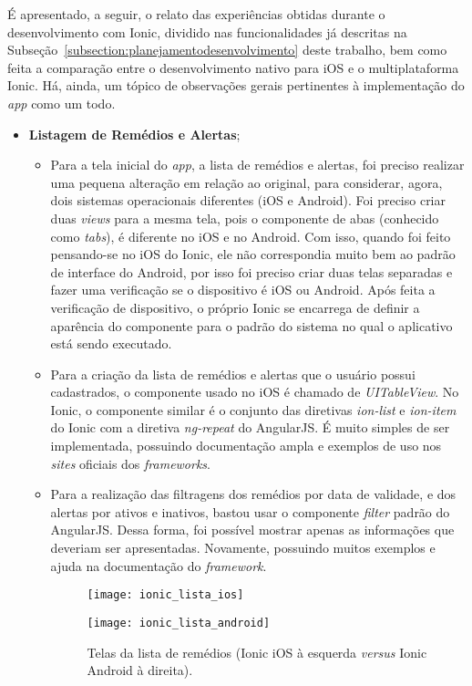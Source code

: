 É apresentado, a seguir, o relato das experiências obtidas durante o desenvolvimento com Ionic, dividido nas funcionalidades 
já descritas na Subseção~\ref{subsection:planejamentodesenvolvimento} deste trabalho, bem como feita a comparação entre o desenvolvimento nativo para iOS e 
o multiplataforma Ionic. Há, ainda, um tópico de observações gerais pertinentes à implementação do \textit{app} como um todo. 


 \begin{itemize}
 	
 	\item \textbf{Listagem de Remédios e Alertas};
		\begin{itemize}
			\item Para a tela inicial do \textit{app}, a lista de remédios e alertas, foi preciso realizar uma pequena alteração em relação ao original, para considerar, agora, 
			dois sistemas operacionais diferentes (iOS e Android). Foi preciso criar duas 
			\textit{views} para a mesma tela, pois o componente de abas (conhecido como \textit{tabs}), é diferente no iOS e no Android. Com isso, quando foi feito pensando-se no iOS do Ionic, ele não correspondia 
			muito bem ao padrão de interface do Android, por isso foi preciso criar duas telas separadas e fazer uma verificação se o dispositivo é iOS ou Android. Após feita a verificação de dispositivo, o próprio
			Ionic se encarrega de definir a aparência do componente para o padrão do sistema no qual o aplicativo está sendo executado.

			\item Para a criação da lista de remédios e alertas que o usuário possui cadastrados, o componente usado no iOS é chamado de \textit{UITableView}. No Ionic, o componente similar é o conjunto das diretivas 
			\textit{ion-list} e \textit{ion-item} do Ionic com a diretiva \textit{ng-repeat} do AngularJS. 
			É muito simples de ser implementada, possuindo documentação ampla e exemplos de uso nos \textit{sites} oficiais dos \textit{frameworks}.

			\item Para a realização das filtragens dos remédios por data de validade, e dos alertas por ativos e inativos, bastou usar o componente \textit{filter} padrão do AngularJS. Dessa forma, foi possível 
			mostrar apenas as informações que deveriam ser apresentadas. Novamente, possuindo muitos exemplos e ajuda na documentação do \textit{framework}.

			 \begin{figure}[H]
			 	\centering
			 	\begin{minipage}{.5\textwidth}
			 		\centering
			 		\texttt{[image: ionic\_lista\_ios]}
			 	\end{minipage}%
			 	\begin{minipage}{.5\textwidth}
			 		\centering
			 		\texttt{[image: ionic\_lista\_android]}
			 	\end{minipage}
			 	\caption[Telas da lista de remédios (Ionic iOS \textit{versus} Ionic Android)]{ Telas da lista de remédios (Ionic iOS à esquerda \textit{versus} Ionic Android à direita).}
			 	\label{fig:ionic_lista}
			 \end{figure}


\end{itemize}
\end{itemize}

